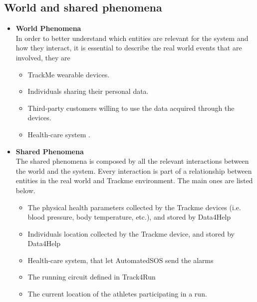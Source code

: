 \documentclass[a4paper, hidelinks, 12pt]{report}
\begin{document}
	\subsection{World and shared phenomena}
	\begin{itemize}
		\item \textbf{World Phenomena}
		\\
		In order to better understand which entities are relevant for the system and how they interact, it is essential to describe the real world events that are involved, they are
		\begin{itemize}
			\item{} TrackMe wearable devices.
			\item{} Individuals sharing their personal data.
			\item{} Third-party customers willing to use the data acquired through the devices.
			\item{} Health-care system .
		\end{itemize}
		
		\item \textbf{Shared Phenomena}
		\\
		The shared phenomena is composed by all the relevant interactions between the world and the system. Every interaction is part of a relationship between entities in the real world and Trackme environment. The main ones are listed below.
		\begin{itemize}
			\item{} The physical health parameters collected by the Trackme devices (i.e. blood pressure, body temperature, etc.), and stored by Data4Help
			\item{} Individuals location collected by the Trackme device, and stored by Data4Help
			\item{} Health-care system, that let AutomatedSOS send the alarms
			\item{} The running circuit defined in Track4Run
			\item{} The current location of the athletes participating in a run.
		\end{itemize}
	\end{itemize}
	
\end{document}

